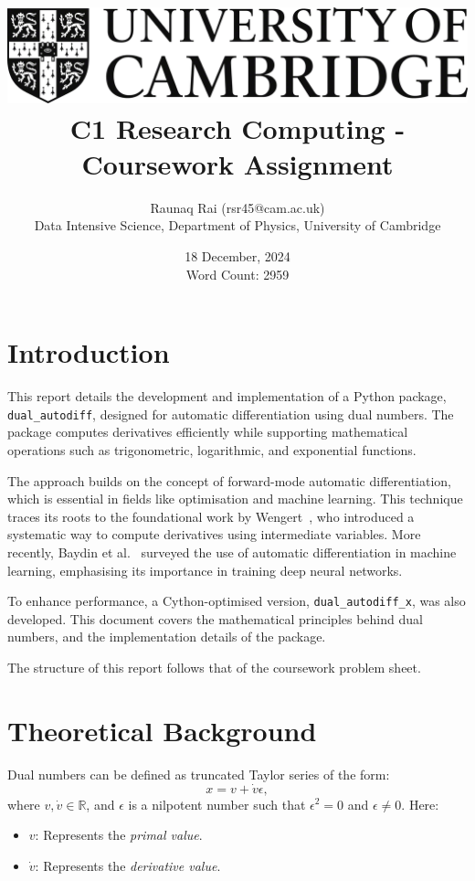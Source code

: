 \documentclass[a4paper,12pt]{article}
\title{
    \includegraphics[scale=0.4]{Cam_logo_bw.png}\\
    \vspace{0.5cm}
    C1 Research Computing - Coursework Assignment
}
\author{Raunaq Rai (rsr45@cam.ac.uk)\\
    Data Intensive Science, Department of Physics, University of Cambridge
}
\date{18 December, 2024 \\ \vspace{0.2cm} {\small Word Count: 2959}}
\begin{document}
\maketitle

\section*{Introduction}
This report details the development and implementation of a Python package, \texttt{dual\_autodiff}, designed for automatic differentiation using dual numbers. The package computes derivatives efficiently while supporting mathematical operations such as trigonometric, logarithmic, and exponential functions.

The approach builds on the concept of forward-mode automatic differentiation, which is essential in fields like optimisation and machine learning. This technique traces its roots to the foundational work by Wengert~\cite{wengert1964automatic}, who introduced a systematic way to compute derivatives using intermediate variables. More recently, Baydin et al.~\cite{baydin2018automatic} surveyed the use of automatic differentiation in machine learning, emphasising its importance in training deep neural networks.

To enhance performance, a Cython-optimised version, \texttt{dual\_autodiff\_x}, was also developed. This document covers the mathematical principles behind dual numbers, and the implementation details of the package.

The structure of this report follows that of the coursework problem sheet.

\section*{Theoretical Background}

Dual numbers can be defined as truncated Taylor series of the form:
\begin{equation}
    x = v + \dot{v}\epsilon,
    \label{eq:dual_number_form}
    \end{equation}
where \(v, \dot{v} \in \mathbb{R}\), and \(\epsilon\) is a nilpotent number such that \(\epsilon^2 = 0\) and \(\epsilon \neq 0\). Here:
\begin{itemize}
    \item \(v\): Represents the \textit{primal value}.
    \item \(\dot{v}\): Represents the \textit{derivative value}.
\end{itemize}
\end{document}
